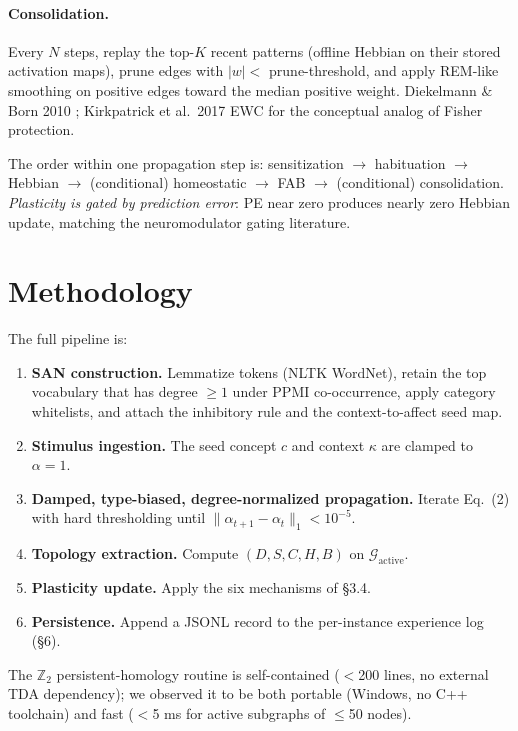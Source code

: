 \documentclass{article}
\begin{document}
\paragraph{Consolidation.} Every $N$ steps, replay the top-$K$ recent
patterns (offline Hebbian on their stored activation maps), prune edges with
$|w| < $ prune-threshold, and apply REM-like smoothing on positive edges
toward the median positive weight.
Diekelmann \& Born 2010 \cite{diekelmann2010memory}; Kirkpatrick et al.\
2017 EWC \cite{kirkpatrick2017overcoming} for the conceptual analog of
Fisher protection.

The order within one propagation step is:
sensitization $\to$ habituation $\to$ Hebbian $\to$ (conditional)
homeostatic $\to$ FAB $\to$ (conditional) consolidation.
\emph{Plasticity is gated by prediction error}: PE near zero produces nearly
zero Hebbian update, matching the neuromodulator gating literature.

\section{Methodology}
The full pipeline is:
\begin{enumerate}
    \item \textbf{SAN construction.} Lemmatize tokens (NLTK WordNet), retain
      the top vocabulary that has degree $\geq 1$ under PPMI co-occurrence,
      apply category whitelists, and attach the inhibitory rule and the
      context-to-affect seed map.
    \item \textbf{Stimulus ingestion.} The seed concept $c$ and context
      $\kappa$ are clamped to $\alpha = 1$.
    \item \textbf{Damped, type-biased, degree-normalized propagation.}
      Iterate Eq.~(2) with hard thresholding until
      $\|\alpha_{t+1} - \alpha_t\|_1 < 10^{-5}$.
    \item \textbf{Topology extraction.} Compute $(D, S, C, H, B)$ on
      $\mathcal{G}_{\text{active}}$.
    \item \textbf{Plasticity update.} Apply the six mechanisms of \S 3.4.
    \item \textbf{Persistence.} Append a JSONL record to the per-instance
      experience log (\S 6).
\end{enumerate}
The $\mathbb{Z}_2$ persistent-homology routine is self-contained
($<$200 lines, no external TDA dependency); we observed it to be both
portable (Windows, no C++ toolchain) and fast ($<$5 ms for active subgraphs
of $\leq$50 nodes).
\end{document}
